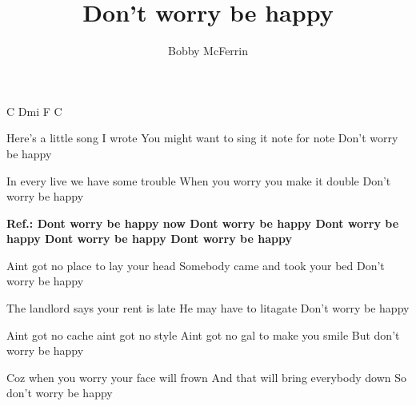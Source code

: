 \beginsong

\title{Don't worry be happy}
\author{Bobby McFerrin}

\intro C Dmi F C

\beginverse
Here's a little song I wrote
You might want to sing it note for note
Don't worry be happy
\endverse

\beginverse
In every live we have some trouble
When you worry you make it double
Don't worry be happy
\endverse

\beginverse
\bf Ref.:
Dont worry be happy now
Dont worry be happy
Dont worry be happy
Dont worry be happy
Dont worry be happy
\endverse

\beginverse
Aint got no place to lay your head
Somebody came and took your bed
Don't worry be happy
\endverse

\beginverse
The landlord says your rent is late
He may have to litagate
Don't worry be happy
\endverse


\beginverse
Aint got no cache aint got no style
Aint got no gal to make you smile
But don't worry be happy
\endverse

\beginverse
Coz when you worry your face will frown
And that will bring everybody down
So don't worry be happy
\endverse

